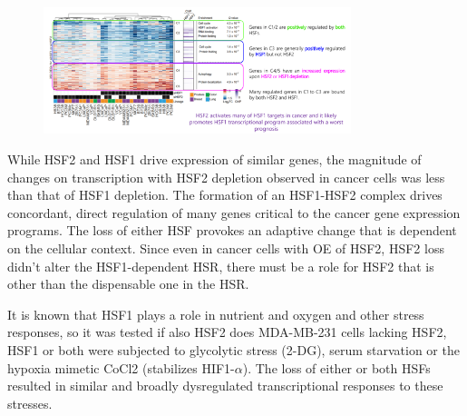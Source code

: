 \begin{figure}
\centering
\includegraphics[width=0.8\textwidth]{../_resources/Screen_Shot_2022-12-20_at_11-45-23.png}
\caption{}
\end{figure}

While HSF2 and HSF1 drive expression of similar genes, the magnitude of changes on transcription with HSF2 depletion observed in cancer cells was less than that of HSF1 depletion. The formation of an HSF1-HSF2 complex drives concordant, direct regulation of many genes critical to the cancer gene expression programs.
The loss of either HSF provokes an adaptive change that is dependent on the cellular context. Since even in cancer cells with OE of HSF2, HSF2 loss didn’t alter the HSF1-dependent HSR, there must be a role for HSF2 that is other than the dispensable one in the HSR.

It is known that HSF1 plays a role in nutrient and oxygen and other stress responses, so it was tested if also HSF2 does MDA-MB-231 cells lacking HSF2, HSF1 or both were subjected to glycolytic stress (2-DG), serum starvation or the hypoxia mimetic CoCl2 (stabilizes HIF1-$\alpha$). The loss of either or both HSFs resulted in similar and broadly dysregulated transcriptional responses to these stresses.

